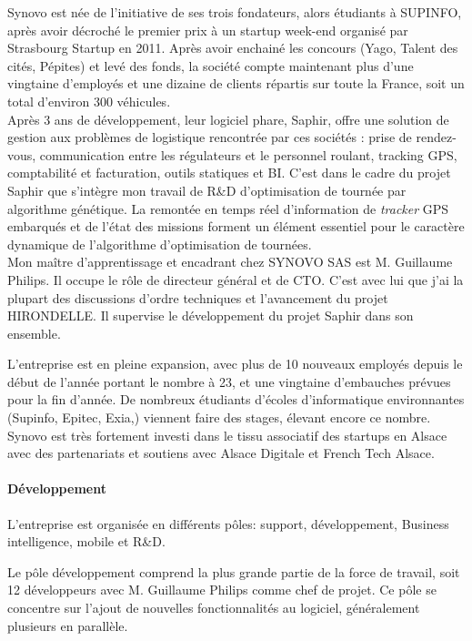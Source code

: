 \documentclass[french, 11pt]{memoir}
\begin{document}
\bigskip
Synovo est née de l'initiative de ses trois fondateurs, alors étudiants
à SUPINFO, après avoir décroché le premier prix à un startup week-end
organisé par Strasbourg Startup en 2011. Après avoir enchainé les
concours (Yago, Talent des cités, Pépites) et levé des fonds, la société
compte maintenant plus d'une vingtaine d'employés et une dizaine de
clients répartis sur toute la France, soit un total d'environ 300
véhicules. \\
Après 3 ans de développement, leur logiciel phare, Saphir, offre une
solution de gestion aux problèmes de logistique rencontrée par ces
sociétés : prise de rendez-vous, communication entre les régulateurs et
le personnel roulant, tracking GPS, comptabilité et facturation, outils
statiques et BI. C'est dans le cadre du projet Saphir que s'intègre mon
travail de R\&D d'optimisation de tournée par algorithme génétique. La
remontée en temps réel d'information de \emph{tracker} GPS embarqués et
de l'état des missions forment un élément essentiel pour le caractère
dynamique de l'algorithme d'optimisation de tournées. \\
Mon maître
d'apprentissage et encadrant chez SYNOVO SAS est M. Guillaume Philips.
Il occupe le rôle de directeur général et de CTO. C'est avec lui que
j'ai la plupart des discussions d'ordre techniques et l'avancement du
projet HIRONDELLE. Il supervise le développement du projet Saphir dans
son ensemble.

\bigskip
L'entreprise est en pleine expansion, avec plus de 10 nouveaux employés
depuis le début de l'année portant le nombre à 23, et une vingtaine
d'embauches prévues pour la fin d'année. De nombreux étudiants d'écoles
d'informatique environnantes (Supinfo, Epitec, Exia,) viennent faire des
stages, élevant encore ce nombre. Synovo est très fortement investi dans
le tissu associatif des startups en Alsace avec des partenariats et
soutiens avec Alsace Digitale et French Tech Alsace.

\paragraph{Développement}\label{duxe9veloppement}

L'entreprise est organisée en différents pôles: support, développement,
Business intelligence, mobile et R\&D.

Le pôle développement comprend la plus grande partie de la force de
travail, soit 12 développeurs avec M. Guillaume Philips comme chef de
projet. Ce pôle se concentre sur l'ajout de nouvelles fonctionnalités au
logiciel, généralement plusieurs en parallèle.
\end{document}
